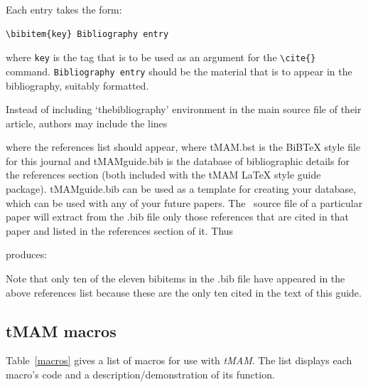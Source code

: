\documentclass[]{tMAM2e}
\begin{document}
\medskip
\noindent Each entry takes the form:
\medskip
\begin{verbatim}
\bibitem{key} Bibliography entry
\end{verbatim}
%
where {\tt key} is the tag that is to be used as an argument for the \verb"\cite{}" command. {\tt Bibliography
entry} should be the material that is to appear in the bibliography, suitably formatted.\bigskip

Instead of including `thebibliography' environment in the main source file of their article, authors may include
the lines \vspace{12pt}

\noindent\verb""
\newline\verb""
\vspace{12pt}

\noindent where the references list should appear, where tMAM.bst is the BiBTeX style file for this journal and
tMAMguide.bib is the database of bibliographic details for the references section (both included with the tMAM
LaTeX style guide package). tMAMguide.bib can be used as a template for creating your database, which can be
used with any of your future papers. The \LaTeXe\ source file of a particular paper will extract from the .bib
file only those references that are cited in that paper and listed in the references section of it.
Thus\vspace{12pt}

\noindent\verb""
\newline\verb""
\vspace{12pt}

\noindent produces:\\\vspace{-50pt}


 \vspace{36pt}

\noindent Note that only ten of the eleven bibitems in the .bib file have appeared in the above references list
because these are the only ten cited in the text of this guide.

\subsection{{\bi tMAM} macros}

Table~\ref{macros} gives a list of macros for use with {\it tMAM}.
The list displays each macro's code and a description/demonstration
of its function.
\end{document}
